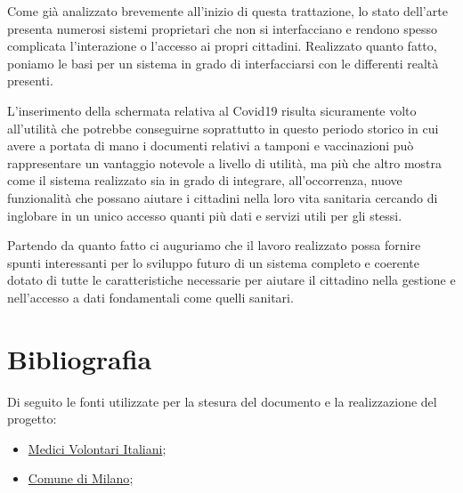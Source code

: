 \documentclass[12pt,a4paper,twoside,openright,titlepage]{book}
\begin{document}
Come già analizzato brevemente all'inizio di questa trattazione, lo stato dell'arte presenta numerosi sistemi proprietari che non si interfacciano e rendono spesso complicata l'interazione o l'accesso ai propri cittadini. Realizzato quanto fatto, poniamo le basi per un sistema in grado di interfacciarsi con le differenti realtà presenti.\newline

L'inserimento della schermata relativa al Covid19 risulta sicuramente volto all'utilità che potrebbe conseguirne soprattutto in questo periodo storico in cui avere a portata di mano i documenti relativi a tamponi e vaccinazioni può rappresentare un vantaggio notevole a livello di utilità, ma più che altro mostra come il sistema realizzato sia in grado di integrare, all'occorrenza, nuove funzionalità che possano aiutare i cittadini nella loro vita sanitaria cercando di inglobare in un unico accesso quanti più dati e servizi utili per gli stessi.\newline

Partendo da quanto fatto ci auguriamo che il lavoro realizzato possa fornire spunti interessanti per lo sviluppo futuro di un sistema completo e coerente dotato di tutte le caratteristiche necessarie per aiutare il cittadino nella gestione e nell'accesso a dati fondamentali come quelli sanitari.

\chapter{Bibliografia}
Di seguito le fonti utilizzate per la stesura del documento e la realizzazione del progetto:
\begin{itemize}
\item \href{https://www.medicivolontaritaliani.org/}{Medici Volontari Italiani};
\item \href{https://www.comune.milano.it/aree-tematiche/servizi-sociali/raccolta-dati-personali-per-interventi-di-emergenza}{Comune di Milano};
\end{itemize}
\end{document}
